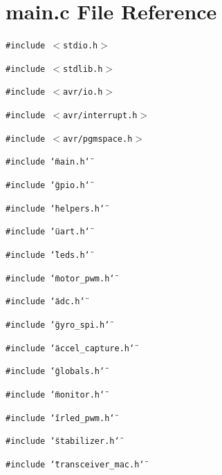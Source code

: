 \section{main.c File Reference}
\label{main_8c}
{\tt \#include $<$stdio.h$>$}\par
{\tt \#include $<$stdlib.h$>$}\par
{\tt \#include $<$avr/io.h$>$}\par
{\tt \#include $<$avr/interrupt.h$>$}\par
{\tt \#include $<$avr/pgmspace.h$>$}\par
{\tt \#include \char`\"{}main.h\char`\"{}}\par
{\tt \#include \char`\"{}gpio.h\char`\"{}}\par
{\tt \#include \char`\"{}helpers.h\char`\"{}}\par
{\tt \#include \char`\"{}uart.h\char`\"{}}\par
{\tt \#include \char`\"{}leds.h\char`\"{}}\par
{\tt \#include \char`\"{}motor\_\-pwm.h\char`\"{}}\par
{\tt \#include \char`\"{}adc.h\char`\"{}}\par
{\tt \#include \char`\"{}gyro\_\-spi.h\char`\"{}}\par
{\tt \#include \char`\"{}accel\_\-capture.h\char`\"{}}\par
{\tt \#include \char`\"{}globals.h\char`\"{}}\par
{\tt \#include \char`\"{}monitor.h\char`\"{}}\par
{\tt \#include \char`\"{}irled\_\-pwm.h\char`\"{}}\par
{\tt \#include \char`\"{}stabilizer.h\char`\"{}}\par
{\tt \#include \char`\"{}transceiver\_\-mac.h\char`\"{}}\par


